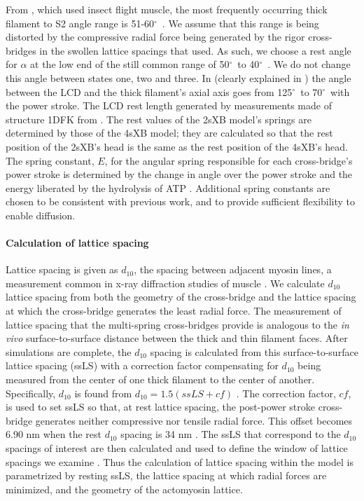 \documentclass[]{article}
\newcommand{\de}{$^\circ$~} %
\begin{document}
\begin{table}[ft]
{    From \citet{Liu2006}, which used insect flight muscle, the most frequently occurring thick filament to S2 angle range is 51-60\de. 
    We assume that this range is being distorted by the compressive radial force being generated by the rigor cross-bridges in the swollen lattice spacings that \citet{Liu2006} used. 
    As such, we choose a rest angle for $\alpha$ at the low end of the still common range of 50\de to 40\de. 
    We do not change this angle between states one, two and three.
    In \citet{Taylor1999} (clearly explained in \citet{Davis2009}) the angle between the LCD and the thick filament's axial axis goes from 125\de to 70\de with the power stroke. 
    The LCD rest length generated by measurements made of structure 1DFK from \citet{Houdusse2000}. 
    The rest values of the 2sXB model's springs are determined by those of the 4sXB model; they are calculated so that the rest position of the 2sXB's head is the same as the rest position of the 4sXB's head. 
    The spring constant, $E$, for the angular spring responsible for each cross-bridge's power stroke is determined by the change in angle over the power stroke and the energy liberated by the hydrolysis of ATP \citep{Tanner2007}. 
    Additional spring constants are chosen to be consistent with previous work, and to provide sufficient flexibility to enable diffusion. 
    }
\end{table}

\paragraph{Calculation of lattice spacing} %
Lattice spacing is given as $d_{10}$, the spacing between adjacent myosin lines, a measurement common in x-ray diffraction studies of muscle \citep{Millman1998}.
We calculate $d_{10}$ lattice spacing from both the geometry of the cross-bridge and the lattice spacing at which the cross-bridge generates the least radial force. 
The measurement of lattice spacing that the multi-spring cross-bridges provide is analogous to the \emph{in vivo} surface-to-surface distance between the thick and thin filament faces.
After simulations are complete, the $d_{10}$ spacing is calculated from this surface-to-surface lattice spacing (ssLS) with a correction factor compensating for $d_{10}$ being measured from the center of one thick filament to the center of another. 
Specifically, $d_{10}$ is found from $d_{10} = 1.5 (ssLS + cf)$ \citep{Millman1998}. 
The correction factor, $cf$, is used to set ssLS so that, at rest lattice spacing, the post-power stroke cross-bridge generates neither compressive nor tensile radial force.  
This offset becomes 6.90 nm when the rest $d_{10}$ spacing is 34 nm \citep{Brenner1991}. 
The ssLS that correspond to the $d_{10}$ spacings of interest are then calculated and used to define the window of lattice spacings we examine \citep{Millman1998}. 
Thus the calculation of lattice spacing within the model is parametrized by resting ssLS, the lattice spacing at which radial forces are minimized, and the geometry of the actomyosin lattice. 
\end{document}
